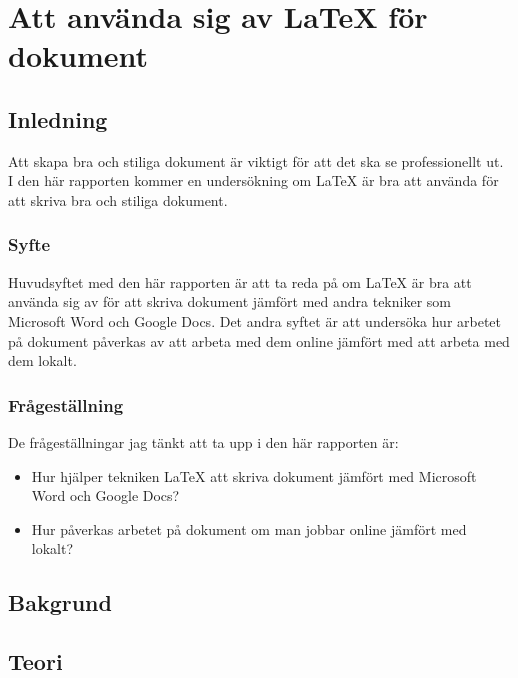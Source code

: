 \chapter{Att använda sig av LaTeX för dokument}
\label{cha:indiv-report-tuhkala}

\section{Inledning}
\label{sec:introduction-tuhkala}
Att skapa bra och stiliga dokument är viktigt för att det ska se professionellt ut. I den här rapporten kommer en undersökning om LaTeX är bra att använda för att skriva bra och stiliga dokument.

\subsection{Syfte}
\label{sec:purpose-tuhkala}
Huvudsyftet med den här rapporten är att ta reda på om LaTeX är bra att använda sig av för att skriva dokument jämfört med andra tekniker som Microsoft Word och Google Docs. Det andra syftet är att undersöka hur arbetet på dokument påverkas av att arbeta med dem online jämfört med att arbeta med dem lokalt.

\subsection{Frågeställning}
\label{sec:issue-tuhkala}
De frågeställningar jag tänkt att ta upp i den här rapporten är:

\begin{itemize}
	\item Hur hjälper tekniken LaTeX att skriva dokument jämfört med Microsoft Word och Google Docs?
	\item Hur påverkas arbetet på dokument om man jobbar online jämfört med lokalt?
\end{itemize}

\section{Bakgrund}
\label{sec:background-tuhkala}


\section{Teori}
\label{sec:theory-tuhkala}

